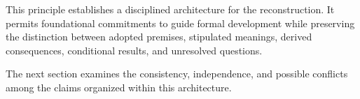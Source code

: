 This principle establishes a disciplined architecture for
the reconstruction. It permits foundational commitments
to guide formal development while preserving the distinction
between adopted premises, stipulated meanings, derived
consequences, conditional results, and unresolved questions.

The next section examines the consistency, independence,
and possible conflicts among the claims organized within
this architecture.

